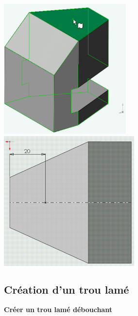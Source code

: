 \begin{minipage}{0.23\linewidth}
\includegraphics[width=0.7\linewidth]{img/012} \\ \vfill
\includegraphics[width=0.7\linewidth]{img/018}
\end{minipage}

\subsection{Création d'un trou lamé}

\textbf{Créer un trou lamé débouchant}

~\

